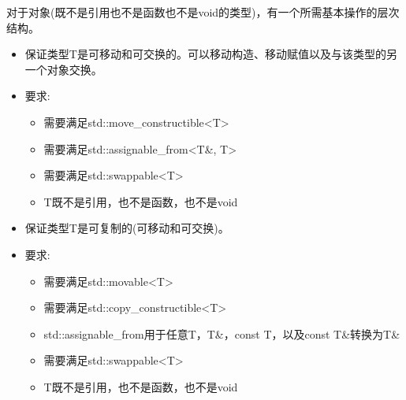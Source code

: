 
对于对象(既不是引用也不是函数也不是void的类型)，有一个所需基本操作的层次结构。


\begin{itemize}
\item
保证类型T是可移动和可交换的。可以移动构造、移动赋值以及与该类型的另一个对象交换。

\item
要求:
\begin{itemize}
\item
需要满足std::move\_constructible<T>

\item
需要满足std::assignable\_from<T\&, T>

\item
需要满足std::swappable<T>

\item
T既不是引用，也不是函数，也不是void
\end{itemize}
\end{itemize}


\begin{itemize}
\item
保证类型T是可复制的(可移动和可交换)。

\item
要求:
\begin{itemize}
\item
需要满足std::movable<T>

\item
需要满足std::copy\_constructible<T>

\item
std::assignable\_from用于任意T，T\&，const T，以及const T\&转换为T\&

\item
需要满足std::swappable<T>

\item
T既不是引用，也不是函数，也不是void
\end{itemize}
\end{itemize}



